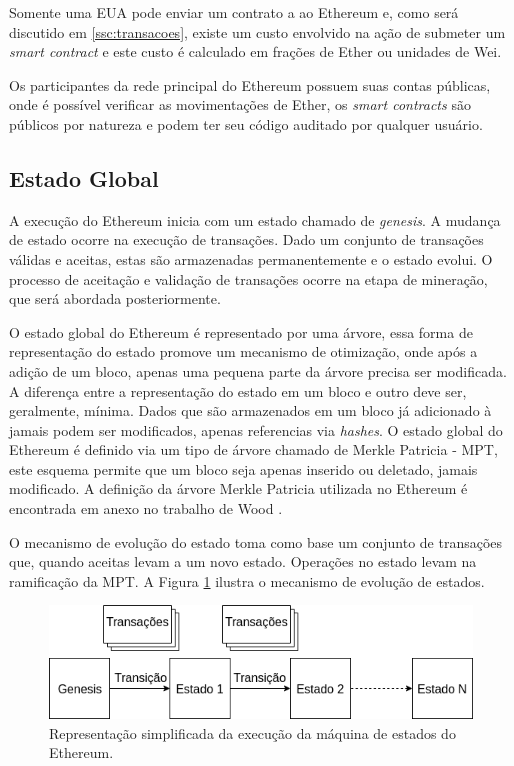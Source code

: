 \documentclass[tcc,capa]{texufpel}
\begin{document}
	Somente uma EUA pode enviar um contrato a ao Ethereum e, como será discutido em \ref{ssc:transacoes}, existe um custo envolvido na ação de submeter um \textit{smart contract} e este custo é calculado em frações de Ether ou unidades de Wei.
	
	Os participantes da rede principal do Ethereum possuem suas contas públicas, onde é possível verificar as movimentações de Ether, os \textit{smart contracts} são públicos por natureza e podem ter seu código auditado por qualquer usuário.

	
	\subsection{Estado Global}\label{ssc:estado-global}
	
	A execução do Ethereum inicia com um estado chamado de \textit{genesis}. A mudança de estado ocorre na execução de transações. Dado um conjunto de transações válidas e aceitas, estas são armazenadas permanentemente e o estado evolui. O processo de aceitação e validação de transações ocorre na etapa de mineração, que será abordada posteriormente.

	O estado global do Ethereum é representado por uma árvore, essa forma de representação do estado promove um mecanismo de otimização, onde após a adição de um bloco, apenas uma pequena parte da árvore precisa ser modificada. A diferença entre a representação do estado em um bloco e outro deve ser, geralmente, mínima. Dados que são armazenados em um bloco já adicionado à \bchain jamais podem ser modificados, apenas referencias via \textit{hashes}. O estado global do Ethereum é definido via um tipo de árvore chamado de Merkle Patricia - MPT, este esquema permite que um bloco seja apenas inserido ou deletado, jamais modificado. A definição da árvore Merkle Patricia utilizada no Ethereum é encontrada em anexo no trabalho de  Wood \cite{wood2014ethereum}.
	
	O mecanismo de evolução do estado toma como base um conjunto de transações que, quando aceitas levam a um novo estado. Operações no estado levam na ramificação da MPT. A Figura \ref{fig:estado-global-ethereum} ilustra o mecanismo de evolução de estados. 
	
	\begin{figure}
        \centering
        \includegraphics[width=15cm]{imagens/estado-global-ethereum.png}
        \caption{Representação simplificada da execução da máquina de estados do Ethereum.}
        \label{fig:estado-global-ethereum}
    \end{figure}
    
\end{document}
